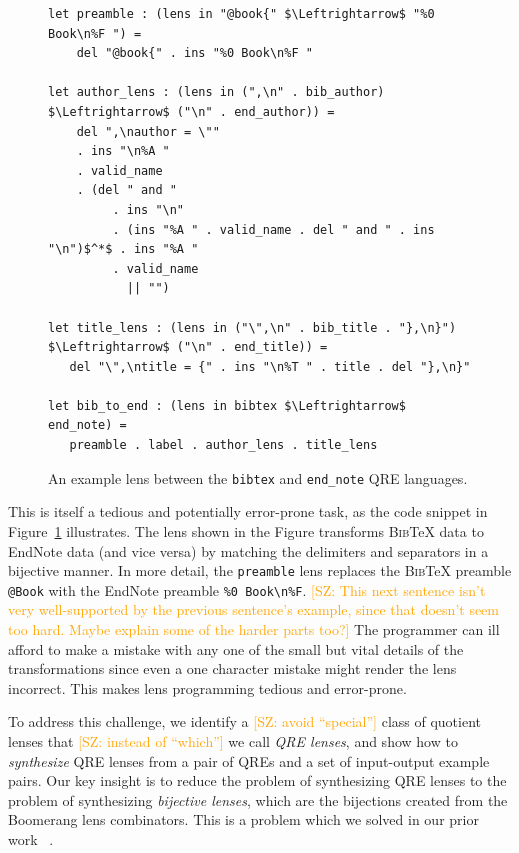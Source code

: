 \documentclass{svproc}
\newcommand{\cd}[1]{\lstinline[backgroundcolor=\color{white}]$#1$}
\newcommand{\FINISH}[3]{\ifdraft\textcolor{#1}{[#2: #3]}\fi}
\newcommand{\saz}[1]{\FINISH{orange}{SZ}{#1}}
\newcommand{\bibtex}{\textsc{Bib}\TeX{}}
\begin{document}
\begin{figure}[t]
\begin{lstlisting}
let preamble : (lens in "@book{" $\Leftrightarrow$ "%0 Book\n%F ") = 
    del "@book{" . ins "%0 Book\n%F "
  
let author_lens : (lens in (",\n" . bib_author) $\Leftrightarrow$ ("\n" . end_author)) = 
    del ",\nauthor = \""
    . ins "\n%A "
    . valid_name
    . (del " and "
         . ins "\n"
         . (ins "%A " . valid_name . del " and " . ins "\n")$^*$ . ins "%A "
         . valid_name
           || "")
           
let title_lens : (lens in ("\",\n" . bib_title . "},\n}") $\Leftrightarrow$ ("\n" . end_title)) =
   del "\",\ntitle = {" . ins "\n%T " . title . del "},\n}" 
    
let bib_to_end : (lens in bibtex $\Leftrightarrow$ end_note) =
   preamble . label . author_lens . title_lens
\end{lstlisting}
\caption{An example lens between the \cd{bibtex} and \cd{end_note} QRE languages.}
\label{fig:example-lens}
\end{figure}

This is itself a tedious and potentially error-prone task, as the code snippet
in Figure~\ref{fig:example-lens} illustrates.  The lens shown in the Figure
transforms \bibtex{} data to EndNote data  (and vice versa) by matching
the delimiters and separators in a bijective manner. In more detail, the
\cd{preamble} lens replaces the \bibtex{} preamble \verb|@Book| with the EndNote
preamble \verb|%0 Book\n%F|. \saz{This next sentence isn't very well-supported
  by the previous sentence's example, since that doesn't seem too hard.  Maybe
  explain some of the harder parts too?}  The programmer can ill
afford to make a mistake with any one of the small but vital details of the
transformations since even a one character mistake might render the lens
incorrect. This makes lens programming tedious and error-prone.

To address this challenge, we identify a \saz{avoid ``special''} class of quotient
lenses that \saz{instead of ``which''} we call {\em QRE lenses}, and show how to {\em
synthesize} QRE lenses from a pair of QREs and a set of input-output
example pairs. Our key insight is to reduce the problem of synthesizing QRE
lenses to the problem of synthesizing {\em bijective lenses}, which are the
bijections created from the Boomerang lens combinators. This is a problem
which we solved in our prior work ~\cite{popl18}.
\end{document}
